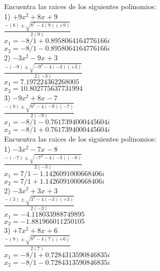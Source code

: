 \documentclass[a4paper,12pt]{article}
\begin{document}
 \pagebreak 
Encuentra las raices de los siguientes polinomios: \vspace{1cm}\\ 
1) $ +9x^{2}+8x^{}+9$ 
\vspace{0.5cm}\\ 
$\frac{-(8)\pm\sqrt{8^2-4(9)(+9)}  }{2(9)}$
\vspace{0.5cm}\\
$x_1=-8/1+0.8958064164776166i$\\
$x_2=-8/1-0.8958064164776166i$
\vspace{1cm}\\ 
2) $ -3x^{2}-9x^{}+3$ 
\vspace{0.5cm}\\ 
$\frac{-(-9)\pm\sqrt{-9^2-4(-3)(+3)}  }{2(-3)}$
\vspace{0.5cm}\\
$x_1=7.197224362268005$\\
$x_2=10.802775637731994$
\vspace{1cm}\\ 
3) $ -9x^{2}+8x^{}-7$ 
\vspace{0.5cm}\\ 
$\frac{-(8)\pm\sqrt{8^2-4(-9)(-7)}  }{2(-9)}$
\vspace{0.5cm}\\
$x_1=-8/1-0.7617394000445604i$\\
$x_2=-8/1+0.7617394000445604i$
\vspace{1cm}\\ 

 \pagebreak 
Encuentra las raices de los siguientes polinomios: \vspace{1cm}\\ 
1) $ -3x^{2}-7x^{}-8$ 
\vspace{0.5cm}\\ 
$\frac{-(-7)\pm\sqrt{-7^2-4(-3)(-8)}  }{2(-3)}$
\vspace{0.5cm}\\
$x_1=7/1-1.1426091000668406i$\\
$x_2=7/1+1.1426091000668406i$
\vspace{1cm}\\ 
2) $ -3x^{2}+3x^{}+3$ 
\vspace{0.5cm}\\ 
$\frac{-(3)\pm\sqrt{3^2-4(-3)(+3)}  }{2(-3)}$
\vspace{0.5cm}\\
$x_1=-4.118033988749895$\\
$x_2=-1.881966011250105$
\vspace{1cm}\\ 
3) $ +7x^{2}+8x^{}+6$ 
\vspace{0.5cm}\\ 
$\frac{-(8)\pm\sqrt{8^2-4(7)(+6)}  }{2(7)}$
\vspace{0.5cm}\\
$x_1=-8/1+0.7284313590846835i$\\
$x_2=-8/1-0.7284313590846835i$
\vspace{1cm}\\ 
\end{document}
